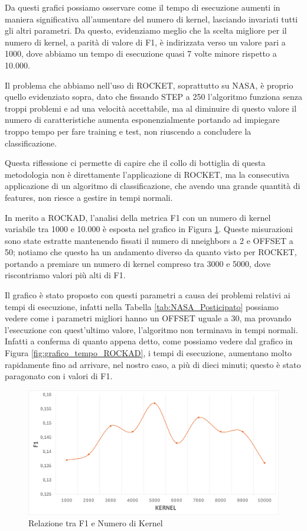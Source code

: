 Da questi grafici possiamo osservare come il tempo di esecuzione aumenti in maniera significativa all'aumentare del numero di kernel, lasciando invariati tutti gli altri parametri. Da questo, evidenziamo meglio che la scelta migliore per il numero di kernel, a parità di valore di F1, è indirizzata verso un valore pari a 1000, dove abbiamo un tempo di esecuzione quasi 7 volte minore rispetto a 10.000. 

Il problema che abbiamo nell'uso di ROCKET, soprattutto su NASA, è proprio quello evidenziato sopra, dato che fissando STEP a 250 l'algoritmo funziona senza troppi problemi e ad una velocità accettabile, ma al diminuire di questo valore il numero di caratteristiche aumenta esponenzialmente portando ad impiegare troppo tempo per fare training e test, non riuscendo a concludere la classificazione. 

Questa riflessione ci permette di capire che il collo di bottiglia di questa metodologia non è direttamente l'applicazione di ROCKET, ma la consecutiva applicazione di un algoritmo di classificazione, che avendo una grande quantità di features, non riesce a gestire in tempi normali.

In merito a ROCKAD, l'analisi della metrica F1 con un numero di kernel variabile tra 1000 e 10.000 è esposta nel grafico in Figura \ref{fig:grafico_f1_ROCKAD}.
Queste misurazioni sono state estratte mantenendo fissati il numero di n\textunderscore neighbors a 2 e OFFSET a 50; notiamo che questo ha un andamento diverso da quanto visto per ROCKET, portando a premiare un numero di kernel compreso tra 3000 e 5000, dove riscontriamo valori più alti di F1.

Il grafico è stato proposto con questi parametri a causa dei problemi relativi ai tempi di esecuzione, infatti nella Tabella \ref{tab:NASA_Posticipato} possiamo vedere come i parametri migliori hanno un OFFSET uguale a 30, ma provando l'esecuzione con quest'ultimo valore, l'algoritmo non terminava in tempi normali.
Infatti a conferma di quanto appena detto, come possiamo vedere dal grafico in Figura \ref{fig:grafico_tempo_ROCKAD}, i tempi di esecuzione, aumentano molto rapidamente fino ad arrivare, nel nostro caso, a più di dieci minuti; questo è stato paragonato con i valori di F1.

\begin{figure}[!ht]
    \centering
    \includegraphics[width=0.9\linewidth]{images//Capitolo7/GraficoF1_ROCKAD.png}
    \caption{Relazione tra F1 e Numero di Kernel}
    \label{fig:grafico_f1_ROCKAD}
\end{figure}

